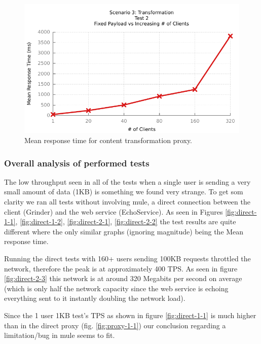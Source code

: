 \begin{figure}[H]
	\caption{Mean response time for content transformation proxy.}
	\centerline{\includegraphics{img/transform_fp_iu_resp}}
	\label{fig:transform-2-2}
\end{figure}


\subsubsection{Overall analysis of performed tests}
\label{sec:test-final-analysis}


The low throughput seen in all of the tests when a single user is sending a very small amount of data (1KB) is something we found very strange. 
To get som clarity we ran all tests without involving mule, a direct connection between the client (Grinder) and the web service (EchoService). As seen in Figures \ref{fig:direct-1-1}, \ref{fig:direct-1-2}, \ref{fig:direct-2-1}, \ref{fig:direct-2-2} the test results are quite different where the only similar graphs (ignoring magnitude) being the Mean response time.

Running the direct tests with 160+ users sending 100KB requests throttled the network, therefore the peak is at approximately 400 TPS. As seen in figure \ref{fig:direct-2-3} this network is at around 320 Megabits per second on average (which is only half the network capacity since the web service is echoing everything sent to it instantly doubling the network load).

Since the 1 user 1KB test's TPS as shown in figure \ref{fig:direct-1-1} is much higher than in the direct proxy (fig. \ref{fig:proxy-1-1}) our conclusion regarding a limitation/bug in mule seems to fit.

